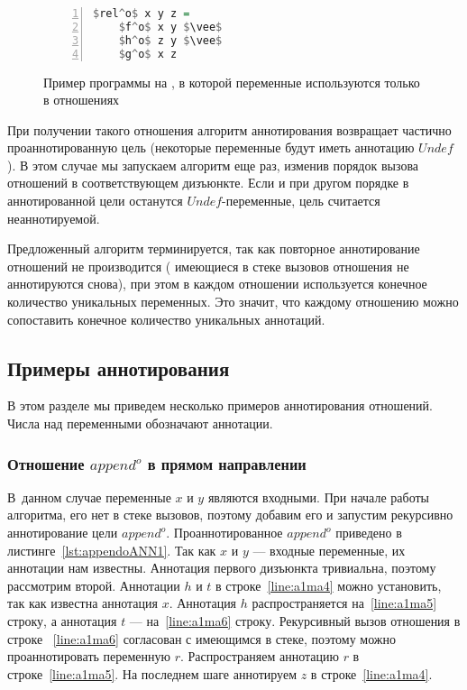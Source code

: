 \documentclass[conference,american,russian]{IEEEtran}
\begin{document}
\begin{figure}[h!]
  \begin{center}
  \begin{minipage}{0.18\textwidth}
  \begin{lstlisting}[language=Haskell, frame=single, numbers=left,numberstyle=\small, escapechar=|]
  $rel^o$ x y z =
    $f^o$ x y $\vee$
    $h^o$ z y $\vee$
    $g^o$ x z
    \end{lstlisting}
  \end{minipage}
  \end{center}
  \caption{Пример программы на \miniKanren{}, в которой переменные используются только в отношениях}
  \label{lst:reloDEF}
\end{figure}

При получении такого отношения алгоритм аннотирования возвращает частично проаннотированную цель (некоторые переменные будут иметь аннотацию  $Undef$).
В этом случае мы запускаем алгоритм еще раз, изменив порядок вызова отношений в соответствующем дизъюнкте.
Если и при другом порядке в аннотированной цели останутся $Undef$-переменные, цель считается неаннотируемой.

Предложенный алгоритм терминируется, так как повторное аннотирование отношений не производится ( имеющиеся в стеке вызовов отношения не аннотируются снова), при этом в каждом отношении используется конечное количество уникальных переменных. 
Это значит, что каждому отношению можно сопоставить конечное количество уникальных аннотаций.

\subsection{Примеры аннотирования}

В этом разделе мы приведем несколько примеров аннотирования отношений.
Числа над переменными обозначают аннотации.

\subsubsection{Отношение $append^o$ в прямом направлении}

В~данном случае  переменные $x$ и $y$ являются входными. 
При начале работы алгоритма, его нет в стеке вызовов, поэтому добавим его и запустим рекурсивно аннотирование цели $append^o$. 
Проаннотированное $append^o$ приведено в листинге~\ref{lst:appendoANN1}.
Так как $x$ и $y$ --- входные переменные, их аннотации нам известны.
Аннотация первого дизъюнкта тривиальна, поэтому рассмотрим второй.
Аннотации $h$ и $t$ в строке~\ref{line:a1ma4} можно установить, так как известна аннотация $x$.
Аннотация $h$ распространяется на~\ref{line:a1ma5} строку, а аннотация $t$ --- на~\ref{line:a1ma6} строку.
Рекурсивный вызов отношения в строке ~\ref{line:a1ma6} согласован с имеющимся в стеке, поэтому можно проаннотировать переменную $r$.
Распространяем аннотацию $r$ в строке~\ref{line:a1ma5}.
На последнем шаге аннотируем $z$ в строке~\ref{line:a1ma4}.
\end{document}

